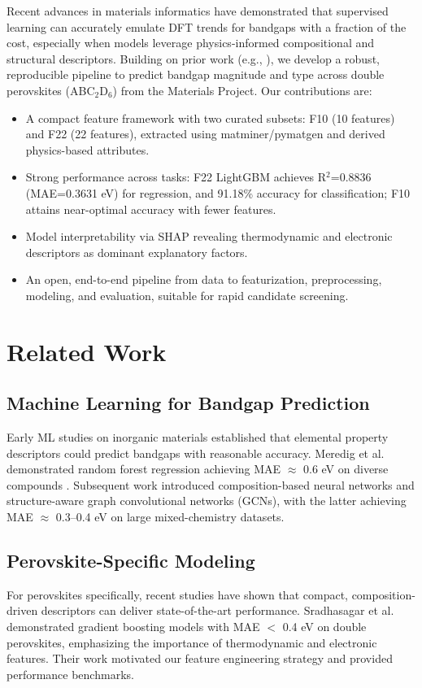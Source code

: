 \documentclass[conference]{IEEEtran}
\begin{document}
Recent advances in materials informatics have demonstrated that supervised learning can accurately emulate DFT trends for bandgaps with a fraction of the cost, especially when models leverage physics-informed compositional and structural descriptors. Building on prior work (e.g., \cite{Sradhasagar2024SolarEnergy}), we develop a robust, reproducible pipeline to predict bandgap magnitude and type across double perovskites (ABC$_2$D$_6$) from the Materials Project. Our contributions are:
\begin{itemize}
  \item A compact feature framework with two curated subsets: F10 (10 features) and F22 (22 features), extracted using matminer/pymatgen and derived physics-based attributes.
  \item Strong performance across tasks: F22 LightGBM achieves R$^2$=0.8836 (MAE=0.3631 eV) for regression, and 91.18\% accuracy for classification; F10 attains near-optimal accuracy with fewer features.
  \item Model interpretability via SHAP revealing thermodynamic and electronic descriptors as dominant explanatory factors.
  \item An open, end-to-end pipeline from data to featurization, preprocessing, modeling, and evaluation, suitable for rapid candidate screening.
\end{itemize}

\section{Related Work}

\subsection{Machine Learning for Bandgap Prediction}
Early ML studies on inorganic materials established that elemental property descriptors could predict bandgaps with reasonable accuracy. Meredig et al. demonstrated random forest regression achieving MAE $\approx$ 0.6 eV on diverse compounds \cite{Ward2018matminer}. Subsequent work introduced composition-based neural networks and structure-aware graph convolutional networks (GCNs), with the latter achieving MAE $\approx$ 0.3--0.4 eV on large mixed-chemistry datasets.

\subsection{Perovskite-Specific Modeling}
For perovskites specifically, recent studies have shown that compact, composition-driven descriptors can deliver state-of-the-art performance. Sradhasagar et al. \cite{Sradhasagar2024SolarEnergy} demonstrated gradient boosting models with MAE $<$ 0.4 eV on double perovskites, emphasizing the importance of thermodynamic and electronic features. Their work motivated our feature engineering strategy and provided performance benchmarks.
\end{document}
